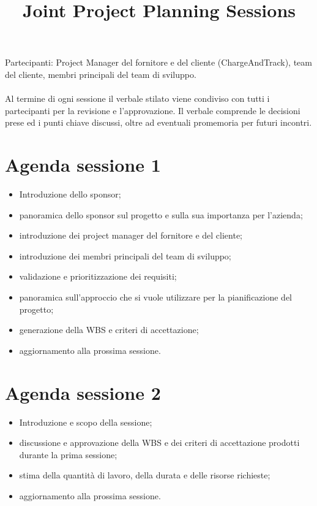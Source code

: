 \documentclass[a4paper,12pt]{article}
\title{\textbf{Joint Project Planning Sessions}}
\author{}
\date{}
\begin{document}
\maketitle

Partecipanti: Project Manager del fornitore e del cliente (ChargeAndTrack), team del cliente, membri principali del
team di sviluppo. \\ \\
Al termine di ogni sessione il verbale stilato viene condiviso con tutti i partecipanti per la revisione e
l'approvazione. Il verbale comprende le decisioni prese ed i punti chiave discussi, oltre ad eventuali
promemoria per futuri incontri.

\section*{Agenda sessione 1}
\begin{itemize}
    \item Introduzione dello sponsor;
    \item panoramica dello sponsor sul progetto e sulla sua importanza per l'azienda;
    \item introduzione dei project manager del fornitore e del cliente;
    \item introduzione dei membri principali del team di sviluppo;
    \item validazione e prioritizzazione dei requisiti;
    \item panoramica sull'approccio che si vuole utilizzare per la pianificazione del progetto;
    \item generazione della WBS e criteri di accettazione;
    \item aggiornamento alla prossima sessione.
\end{itemize}

\section*{Agenda sessione 2}
\begin{itemize}
    \item Introduzione e scopo della sessione;
    \item discussione e approvazione della WBS e dei criteri di accettazione prodotti durante la prima sessione;
    \item stima della quantità di lavoro, della durata e delle risorse richieste;
    \item aggiornamento alla prossima sessione.
\end{itemize}
\end{document}
